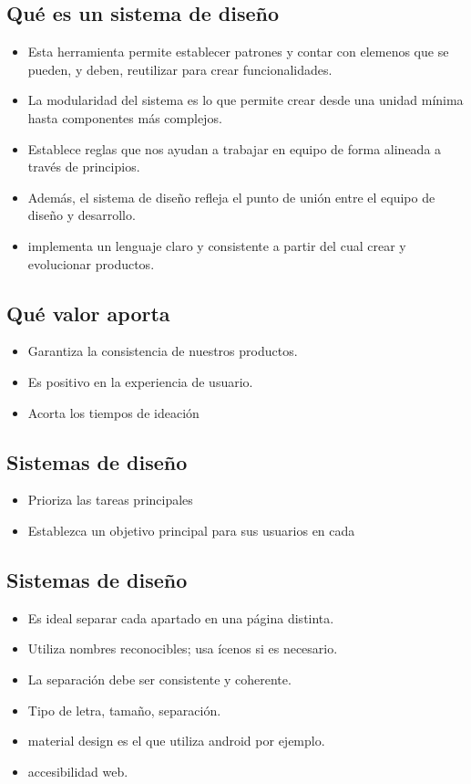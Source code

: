 \documentclass{article}
\begin{document}
\subsection{Qué es un sistema de diseño}
\begin{itemize}
    \item Esta herramienta permite establecer patrones y contar con elemenos que se pueden, y deben, reutilizar para crear funcionalidades.
    \item La modularidad del sistema es lo que permite crear desde una unidad mínima hasta componentes más complejos.
    \item Establece reglas que nos ayudan a trabajar en equipo de forma alineada a través de principios.
    \item Además, el sistema de diseño refleja el punto de unión entre el equipo de diseño y desarrollo.
    \item implementa un lenguaje claro y consistente a partir del cual crear y evolucionar productos.
\end{itemize}

\subsection{Qué valor aporta}
\begin{itemize}
    \item Garantiza la consistencia de nuestros productos.
    \item Es positivo en la experiencia de usuario.
    \item Acorta los tiempos de ideación
\end{itemize}

\subsection{Sistemas de diseño}
\begin{itemize}
    \item Prioriza las tareas principales
    \item Establezca un objetivo principal para sus usuarios en cada 
\end{itemize}

\subsection{Sistemas de diseño}
\begin{itemize}
    \item Es ideal separar cada apartado en una página distinta.
    \item Utiliza nombres reconocibles; usa ícenos si es necesario.
    \item La separación debe ser consistente y coherente.
    \item Tipo de letra, tamaño, separación.
    \item material design es el que utiliza android por ejemplo.
    \item accesibilidad web. 
\end{itemize}
\end{document}

